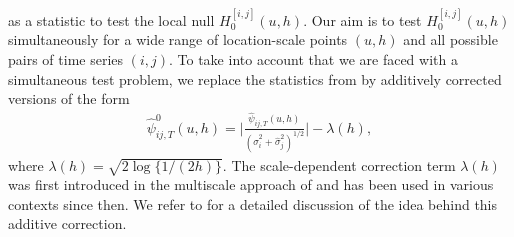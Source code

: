 \documentclass[12pt]{article}
\makeatletter
\renewcommand{\eqref}[1]{\tagform@{\ref{#1}}}
\makeatother
\begin{document}
as a statistic to test the local null $H_0^{[i, j]}(u, h)$. Our aim is to test $H_0^{[i, j]}(u, h)$ simultaneously for a wide range of location-scale points $(u,h)$ and all possible pairs of time series $(i,j)$. To take into account that we are faced with a simultaneous test problem, we replace the statistics from \eqref{eq:local-stat-without-correction} by additively corrected versions of the form 
\begin{align}\label{eq:psi_zero_ij}
\widehat{\psi}^0_{ij, T}(u, h) =  \Big|\frac{\widehat{\psi}_{ij, T}(u, h)}{(\widehat{\sigma}_i^2 + \widehat{\sigma}_j^2)^{1/2}}\Big| - \lambda(h),
\end{align}
where $\lambda(h) = \sqrt{2 \log \{ 1/(2h) \}}$. The scale-dependent correction term $\lambda(h)$ was first introduced in the multiscale approach of \cite{DuembgenSpokoiny2001} and has been used in various contexts since then. We refer to \citet{KhismatullinaVogt2020} for a detailed discussion of the idea behind this additive correction. 
\end{document}
